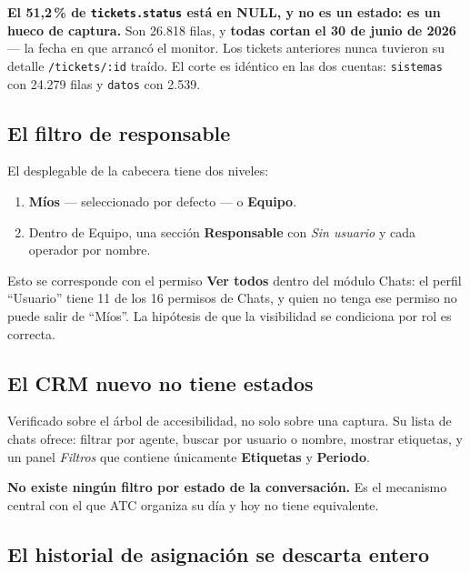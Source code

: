 \documentclass[11pt,a4paper]{article}
\newcommand{\cod}[1]{\texttt{\small #1}}
\begin{document}
\begin{alerta}
\textbf{El 51,2\,\% de \cod{tickets.status} está en NULL, y no es un estado: es un hueco
de captura.} Son 26.818 filas, y \textbf{todas cortan el 30 de junio de 2026} --- la
fecha en que arrancó el monitor. Los tickets anteriores nunca tuvieron su detalle
\cod{/tickets/:id} traído. El corte es idéntico en las dos cuentas: \cod{sistemas} con
24.279 filas y \cod{datos} con 2.539.
\end{alerta}

\subsection{El filtro de responsable}

El desplegable de la cabecera tiene dos niveles:

\begin{enumerate}
  \item \textbf{Míos} --- seleccionado por defecto --- o \textbf{Equipo}.
  \item Dentro de Equipo, una sección \textbf{Responsable} con \emph{Sin usuario} y cada
        operador por nombre.
\end{enumerate}

Esto se corresponde con el permiso \textbf{Ver todos} dentro del módulo Chats: el perfil
``Usuario'' tiene 11 de los 16 permisos de Chats, y quien no tenga ese permiso no puede
salir de ``Míos''. La hipótesis de que la visibilidad se condiciona por rol es correcta.

\subsection{El CRM nuevo no tiene estados}

Verificado sobre el árbol de accesibilidad, no solo sobre una captura. Su lista de chats
ofrece: filtrar por agente, buscar por usuario o nombre, mostrar etiquetas, y un panel
\emph{Filtros} que contiene únicamente \textbf{Etiquetas} y \textbf{Periodo}.

\textbf{No existe ningún filtro por estado de la conversación.} Es el mecanismo central
con el que ATC organiza su día y hoy no tiene equivalente.

\subsection{El historial de asignación se descarta entero}
\end{document}
